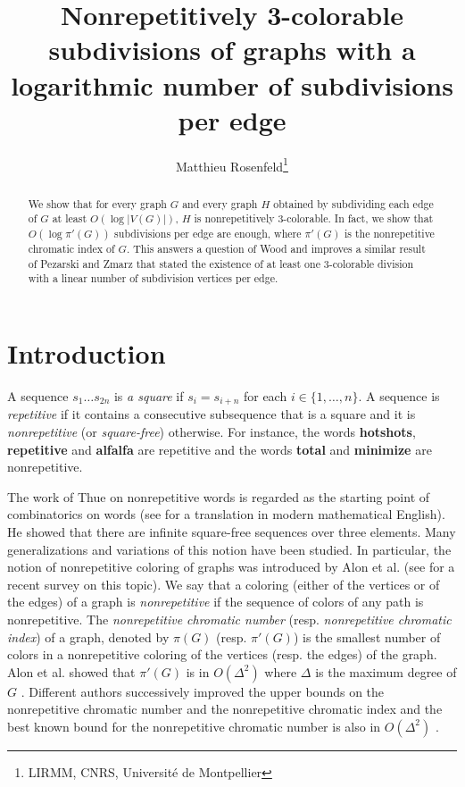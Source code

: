 \documentclass[a4paper,12pt]{article}
\title{Nonrepetitively 3-colorable subdivisions of graphs with a logarithmic number of subdivisions per edge}
\author{Matthieu Rosenfeld\footnote{LIRMM, CNRS, Université de Montpellier}}
\begin{document}
\maketitle
\begin{abstract}
We show that for every graph $G$ and every graph $H$ obtained by subdividing each edge of $G$ at least $O(\log |V(G)|)$, $H$ is nonrepetitively 3-colorable. In fact, we show that  $O(\log \pi'(G))$ subdivisions per edge are enough, where $\pi'(G)$ is the nonrepetitive chromatic index of $G$.
This answers a question of Wood and improves a similar result of  Pezarski and Zmarz that stated the existence of at least one 3-colorable division with a linear number of subdivision vertices per edge.
\end{abstract}


\section{Introduction}

A sequence $s_1\ldots s_{2n}$ is \emph{a square} if
$s_i=s_{i+n}$  for each $i\in\{1,\ldots,n\}$.
A sequence is \emph{repetitive} if it contains a consecutive subsequence that is a square 
and it is \emph{nonrepetitive} (or \emph{square-free}) otherwise. 
For instance, the words \textbf{hotshots}, \textbf{repetitive} and \textbf{alfalfa} are repetitive and
the words \textbf{total} and \textbf{minimize} are nonrepetitive.

The work of Thue on nonrepetitive words is regarded as the starting point of combinatorics on words
\cite{Thue06,Thue1} 
(see \cite{BerstelThue} for a translation in modern mathematical English).  He showed that there are infinite square-free  sequences over three elements.
Many generalizations and variations of this notion have been studied.
In particular, the notion of nonrepetitive coloring of graphs was introduced
by Alon et al. \cite{alongraph} 
(see \cite{woodSurvey} for a recent survey on this topic).
We say that a coloring (either of the vertices or of the edges) of a graph is \emph{nonrepetitive} if the sequence of colors of any path is nonrepetitive.
The \emph{nonrepetitive chromatic number} (resp. \emph{nonrepetitive chromatic index}) of a graph, denoted by $\pi(G)$ (resp. $\pi'(G)$) is the smallest number of colors in a nonrepetitive coloring of the vertices (resp. the edges) of the graph. 
Alon et al. showed that $\pi'(G)$ is in $O(\Delta^2)$ where $\Delta$ is the maximum degree of $G$ \cite{alongraph}.  
Different authors successively improved the upper bounds on the nonrepetitive chromatic number and the nonrepetitive chromatic index and the best known bound for the nonrepetitive chromatic number is also in $O(\Delta^2)$ \cite{ Dujmovic2016, MontassierEntropie, HARANT2012374, rosenfeldCounting}. 
\end{document}
